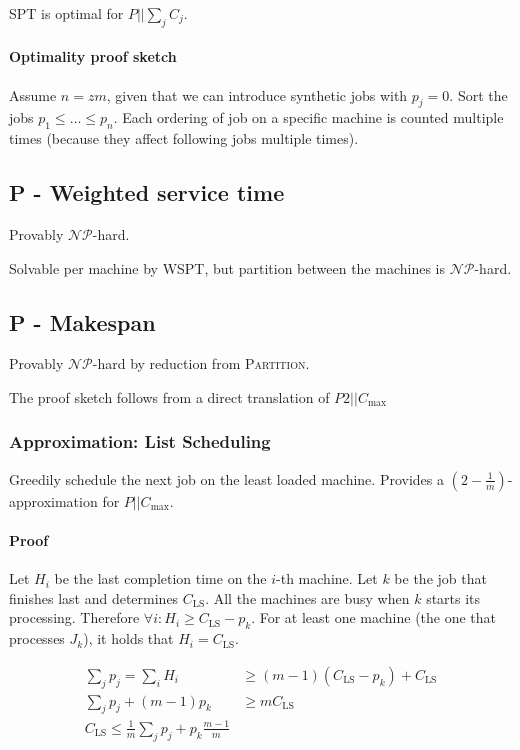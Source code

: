 \documentclass{idc_msc}
\newcommand{\NPclass}{\mathcal{NP}}
\begin{document}
SPT is optimal for \(P||\sum_j C_j\).

\paragraph{Optimality proof sketch}

Assume \(n=zm\), given that we can introduce synthetic jobs with \(p_j=0\).
Sort the jobs \(p_1 \le \ldots \le p_n\).
Each ordering of job on a specific machine is counted multiple times (because they affect following jobs multiple times).

\subsection{P - Weighted service time}

Provably \(\NPclass\)-hard.

Solvable per machine by WSPT, but partition between the machines is \(\NPclass\)-hard.

\subsection{P - Makespan}

Provably \(\NPclass\)-hard by reduction from \textsc{Partition}.

The proof sketch follows from a direct translation of \(P2||C_{\max}\)

\subsubsection{Approximation: List Scheduling}

Greedily schedule the next job on the least loaded machine.
Provides a \(\left(2-\frac{1}{m}\right)\)-approximation for \(P||C_{\max}\).

\paragraph{Proof}

Let \(H_i\) be the last completion time on the \(i\)-th machine.
Let \(k\) be the job that finishes last and determines \(C_{\text{LS}}\).
All the machines are busy when \(k\) starts its processing.
Therefore \(\forall i : H_i \ge C_{\text{LS}} - p_k\).
For at least one machine (the one that processes \(J_k\)), it holds that \(H_i = C_{\text{LS}}\).

\[
\begin{aligned}
  \sum_j p_j = \sum_i H_i &\ge (m-1)(C_{\text{LS}} - p_k) + C_{\text{LS}} \\
  \sum_j p_j + (m-1)p_k &\ge m C_{\text{LS}} \\
  C_{\text{LS}} \le \frac{1}{m} \sum_j p_j + p_k \frac{m-1}{m}
\end{aligned}
\]
\end{document}
